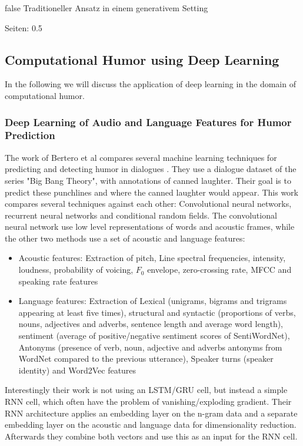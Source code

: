 \documentclass[draft,final,oneside]{vutinfth} %
\begin{document}
\if false
Traditioneller Ansatz in einem generativem Setting

\cite{HumoristBot}

Seiten: 0.5
\fi

\subsection{Computational Humor using Deep Learning}

In the following we will discuss the application of deep learning in the domain of computational humor. 

\subsubsection{Deep Learning of Audio and Language Features for Humor Prediction}

The work of Bertero et al compares several machine learning techniques for predicting and detecting humor in dialogues \cite{Bertero2016DeepLO}. They use a dialogue dataset of the series "Big Bang Theory", with annotations of canned laughter. Their goal is to predict these punchlines and where the canned laughter would appear. This work compares several techniques against each other: Convolutional neural networks, recurrent neural networks and conditional random fields. The convolutional neural network use low level representations of words and acoustic frames, while the other two methods use a set of acoustic and language features:

\begin{itemize}
\item Acoustic features: Extraction of pitch, Line spectral frequencies, intensity, loudness, probability of voicing, $F_0$ envelope, zero-crossing rate, MFCC and speaking rate features
\item Language features: Extraction of Lexical (unigrams, bigrams and trigrams appearing at least five times), structural and syntactic (proportions of verbs, nouns, adjectives and adverbs, sentence length and average word length), sentiment (average of positive/negative sentiment scores of SentiWordNet), Antonyms (presence of verb, noun, adjective and adverbs antonyms from WordNet compared to the previous utterance), Speaker turns (speaker identity) and Word2Vec features
\end{itemize}

Interestingly their work is not using an LSTM/GRU cell, but instead a simple RNN cell, which often have the problem of vanishing/exploding gradient. \cite{hochreiter} Their RNN architecture applies an embedding layer on the n-gram data and a separate embedding layer on the acoustic and language data for dimensionality reduction. Afterwards they combine both vectors and use this as an input for the RNN cell.
\end{document}
